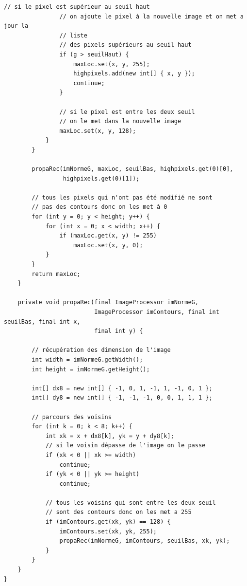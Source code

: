 \documentclass[a4paper,11pt]{article}
\begin{document}
\begin{lstlisting}[caption=Plugin pour le seuillage des maxima locaux par hystérésis]
                // si le pixel est supérieur au seuil haut
                // on ajoute le pixel à la nouvelle image et on met a jour la
                // liste
                // des pixels supérieurs au seuil haut
                if (g > seuilHaut) {
                    maxLoc.set(x, y, 255);
                    highpixels.add(new int[] { x, y });
                    continue;
                }

                // si le pixel est entre les deux seuil
                // on le met dans la nouvelle image
                maxLoc.set(x, y, 128);
            }
        }

        propaRec(imNormeG, maxLoc, seuilBas, highpixels.get(0)[0],
                 highpixels.get(0)[1]);

        // tous les pixels qui n'ont pas été modifié ne sont
        // pas des contours donc on les met à 0
        for (int y = 0; y < height; y++) {
            for (int x = 0; x < width; x++) {
                if (maxLoc.get(x, y) != 255)
                    maxLoc.set(x, y, 0);
            }
        }
        return maxLoc;
    }

    private void propaRec(final ImageProcessor imNormeG,
                          ImageProcessor imContours, final int seuilBas, final int x,
                          final int y) {

        // récupération des dimension de l'image
        int width = imNormeG.getWidth();
        int height = imNormeG.getHeight();

        int[] dx8 = new int[] { -1, 0, 1, -1, 1, -1, 0, 1 };
        int[] dy8 = new int[] { -1, -1, -1, 0, 0, 1, 1, 1 };

        // parcours des voisins
        for (int k = 0; k < 8; k++) {
            int xk = x + dx8[k], yk = y + dy8[k];
            // si le voisin dépasse de l'image on le passe
            if (xk < 0 || xk >= width)
                continue;
            if (yk < 0 || yk >= height)
                continue;

            // tous les voisins qui sont entre les deux seuil
            // sont des contours donc on les met a 255
            if (imContours.get(xk, yk) == 128) {
                imContours.set(xk, yk, 255);
                propaRec(imNormeG, imContours, seuilBas, xk, yk);
            }
        }
    }
}

\end{lstlisting}

  
\end{document}
